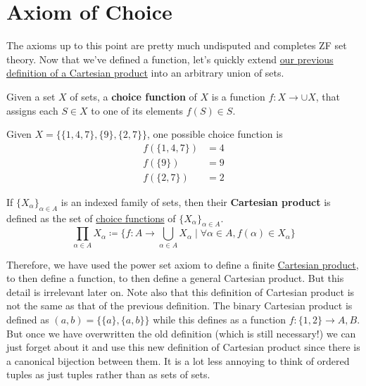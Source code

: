 \section{Axiom of Choice}

  The axioms up to this point are pretty much undisputed and completes ZF set theory. Now that we've defined a function, let's quickly extend \hyperref[def:cart-prod]{our previous definition of a Cartesian product} into an arbitrary union of sets. 

  \begin{definition}
    \label{def:choice-function}
    Given a set $X$ of sets, a \textbf{choice function} of $X$ is a function $f: X \to \cup X$, that assigns each $S \in X$ to one of its elements $f(S) \in S$. 
  \end{definition}

  \begin{example}
    \label{ex:a-choice-function-on-a-finite-family}
    Given $X = \{\{1, 4, 7\}, \{9\}, \{2, 7\}\}$, one possible choice function is 
    \begin{align}
      f(\{1, 4, 7\}) & = 4 \\ 
      f(\{9\}) & = 9 \\ 
      f(\{2, 7\}) & = 2
    \end{align}
  \end{example}

 
  \begin{definition}
    \label{def:cart-prod-2}
    If $\{X_\alpha\}_{\alpha \in A}$ is an indexed family of sets, then their \textbf{Cartesian product} is defined as the set of \hyperref[def:choice-function]{choice functions} of $\{X_\alpha\}_{\alpha \in A}$. 
    \begin{equation}
      \prod_{\alpha \in A} X_\alpha \coloneqq \bigg\{ f: A \rightarrow \bigcup_{\alpha \in A} X_\alpha \;\Big|\; \forall \alpha \in A, f(\alpha) \in X_\alpha \bigg\} 
    \end{equation}
  \end{definition} 

  Therefore, we have used the power set axiom to define a finite \hyperref[def:cart-prod-2]{Cartesian product}, to then define a function, to then define a general Cartesian product. But this detail is irrelevant later on. Note also that this definition of Cartesian product is not the same as that of the previous definition. The binary Cartesian product is defined as $(a, b) = \{\{a\}, \{a, b\}\}$ while this defines as a function $f: \{1, 2\} \rightarrow A, B$. But once we have overwritten the old definition (which is still necessary!) we can just forget about it and use this new definition of Cartesian product since there is a canonical bijection between them. It is a lot less annoying to think of ordered tuples as just tuples rather than as sets of sets. 

